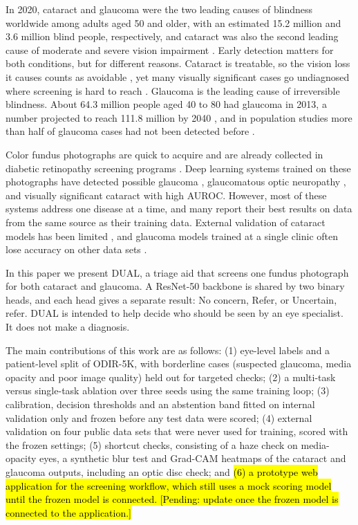 \documentclass[conference,a4paper]{IEEEtran}
\newcommand{\pendingedit}[1]{\hl{#1}}
\begin{document}
In 2020, cataract and glaucoma were the two leading causes of blindness worldwide among adults aged
50 and older, with an estimated 15.2 million and 3.6 million blind people, respectively, and
cataract was also the second leading cause of moderate and severe vision impairment \cite{ref1}.
Early detection matters for both conditions, but for different reasons. Cataract is treatable, so
the vision loss it causes counts as avoidable \cite{ref1}, yet many visually significant cases go
undiagnosed where screening is hard to reach \cite{ref2}. Glaucoma is the leading cause of
irreversible blindness. About 64.3 million people aged 40 to 80 had glaucoma in 2013, a number
projected to reach 111.8 million by 2040 \cite{ref3}, and in population studies more than half of
glaucoma cases had not been detected before \cite{ref4}.

Color fundus photographs are quick to acquire and are already collected in diabetic retinopathy
screening programs \cite{ref5}. Deep learning systems trained on these photographs have detected
possible glaucoma \cite{ref5}, glaucomatous optic neuropathy \cite{ref6}, \cite{ref7} and visually
significant cataract \cite{ref2} with high AUROC. However, most of these systems address one disease
at a time, and many report their best results on data from the same source as their training data.
External validation of cataract models has been limited \cite{ref8}, and glaucoma models trained at
a single clinic often lose accuracy on other data sets \cite{ref9}.

In this paper we present DUAL, a triage aid that screens one fundus photograph for both cataract and
glaucoma. A ResNet-50 backbone is shared by two binary heads, and each head gives a separate result:
No concern, Refer, or Uncertain, refer. DUAL is intended to help decide who should be seen by an eye
specialist. It does not make a diagnosis.

The main contributions of this work are as follows: (1) eye-level labels and a patient-level split
of ODIR-5K, with borderline cases (suspected glaucoma, media opacity and poor image quality) held
out for targeted checks; (2) a multi-task versus single-task ablation over three seeds using the
same training loop; (3) calibration, decision thresholds and an abstention band fitted on internal
validation only and frozen before any test data were scored; (4) external validation on four public
data sets that were never used for training, scored with the frozen settings; (5) shortcut checks,
consisting of a haze check on media-opacity eyes, a synthetic blur test and Grad-CAM \cite{ref10}
heatmaps of the cataract and glaucoma outputs, including an optic disc check; and \pendingedit{(6) a prototype
web application for the screening workflow, which still uses a mock scoring model until the frozen
model is connected. [Pending: update once the frozen model is connected to the application.]}
\end{document}
